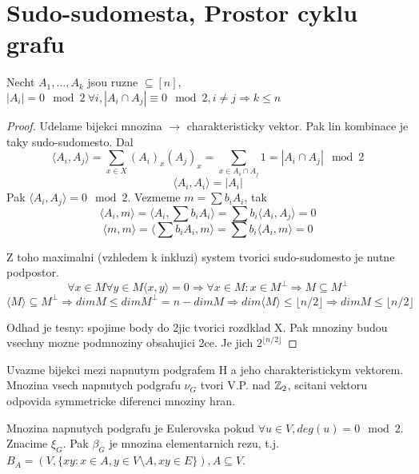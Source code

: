 \section{\texorpdfstring{Sudo-sudomesta, Prostor cyklu grafu}{Sudo-sudomesta, Prostor cyklu grafu}}
\vspace{5mm}
\large

\begin{theorem}
	Necht $A_1, ... , A_k$ jsou ruzne $ \subseteq [n]$, $ |A_i| = 0 \mod2 \ \forall i, |A_i \cap A_j| \equiv 0 \mod2, i \ne j \Rightarrow k \leq n$
\end{theorem}
\begin{proof}
	Udelame bijekci mnozina $\to$ charakteristicky vektor. Pak lin kombinace je taky sudo-sudomesto. Dal
	\[ \langle A_i, A_j \rangle = \sum_{x \in X} (A_i)_x (A_j)_x = \sum_{x \in A_i \cap A_j} 1 = |A_i \cap A_j| \mod2 \]
	\[ \langle A_i, A_i \rangle = |A_i| \]
	Pak $ \langle A_i, A_j \rangle = 0 \mod2 $. Vezmeme $ m = \sum b_iA_i $, tak
	\[ \langle A_i, m \rangle = \langle A_i, \sum b_iA_i \rangle = \sum b_i \langle A_i, A_j \rangle = 0 \]
	\[ \langle m,m \rangle = \langle \sum b_iA_i, m \rangle = \sum b_i \langle A_i, m \rangle = 0 \]

	Z toho maximalni (vzhledem k inkluzi) system tvorici sudo-sudomesto je nutne podpostor.
	\[ \forall x \in M \forall y \in M \langle x, y \rangle = 0 \Rightarrow \forall x \in M: x \in M^{\perp} \Rightarrow M \subseteq M^{\perp} \]
	\[ \langle M \rangle \subseteq M^{\perp} \Rightarrow dim M \leq dim M^{\perp} = n - dim M \Rightarrow dim \langle M \rangle \leq \lfloor n/2 \rfloor \Rightarrow dim M \leq \lfloor n/2 \rfloor \]

	Odhad je tesny: spojime body do 2jic tvorici rozdklad X. Pak mnoziny budou vsechny mozne podmnoziny obsahujici 2ce. Je jich $ 2^{\lfloor n/2 \rfloor} $
\end{proof}


\begin{definition}
Uvazme bijekci mezi napnutym podgrafem H a jeho charakteristickym vektorem. Mnozina vsech napnutych podgrafu $\nu_G$ tvori V.P. nad $\operatorname{\mathbb{Z}}_2$, scitani vektoru odpovida symmetricke diferenci mnoziny hran.
\end{definition}
\begin{definition}
	Mnozina napnutych podgrafu je Eulerovska pokud $\forall u \in V, deg(u) = 0 \mod2$. Znacime $\xi_G$. Pak $\beta_G$ je mnozina elementarnich rezu, t.j. $B_A = (V, \{xy: x \in A, y\in V\setminus A, xy\in E\}), A \subseteq V$.
\end{definition}

